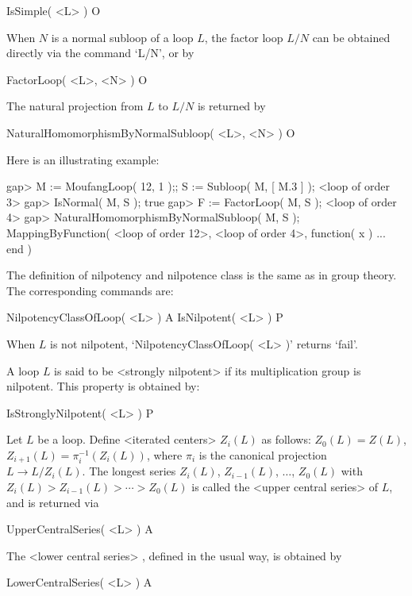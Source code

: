 \>IsSimple( <L> ) O


When $N$ is a normal subloop of a loop $L$, the factor loop $L/N$ can be
obtained directly via the command `L/N', or by

\>FactorLoop( <L>, <N> ) O

The natural projection from $L$ to $L/N$ is returned by

\>NaturalHomomorphismByNormalSubloop( <L>, <N> ) O

Here is an illustrating example:

\beginexample
gap> M := MoufangLoop( 12, 1 );; S := Subloop( M, [ M.3 ] );
<loop of order 3>
gap> IsNormal( M, S );
true
gap> F := FactorLoop( M, S );
<loop of order 4>
gap> NaturalHomomorphismByNormalSubloop( M, S );
MappingByFunction( <loop of order 12>, <loop of order 4>,
    function( x ) ... end )
\endexample


The definition of nilpotency and nilpotence class is the same as in group
theory. The corresponding commands are:

\>NilpotencyClassOfLoop( <L> ) A
\>IsNilpotent( <L> ) P

When $L$ is not nilpotent, `NilpotencyClassOfLoop( <L> )' returns `fail'.

A loop $L$ is said to be <strongly nilpotent> if its multiplication group is nilpotent. This property is obtained by:

\>IsStronglyNilpotent( <L> ) P

Let $L$ be a loop. Define <iterated centers>
%
%
 $Z_i(L)$ as
follows: $Z_0(L)=Z(L)$, $Z_{i+1}(L) = \pi_i^{-1}( Z_i(L) )$, where $\pi_i$ is
the canonical projection $L\to L/Z_i(L)$. The longest series $Z_i(L)$,
$Z_{i-1}(L)$, $\dots$, $Z_0(L)$ with $Z_i(L)>Z_{i-1}(L)>\cdots >Z_0(L)$ is
called the <upper central series>
%
%
 of $L$, and is returned via

\>UpperCentralSeries( <L> ) A

The <lower central series>
%
%
, defined in the usual way, is obtained by

\>LowerCentralSeries( <L> ) A


